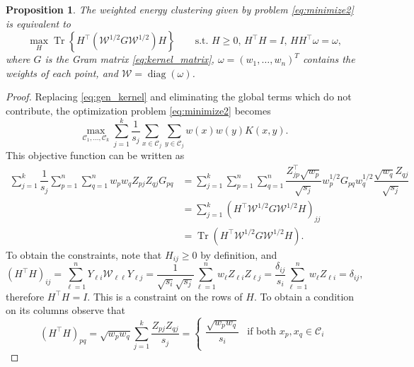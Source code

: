 \documentclass[aps,preprint,nofootinbib,floatfix]{revtex4-1}
\newtheorem{proposition}[theorem]{Proposition}
\DeclareMathOperator{\diag}{diag}
\DeclareMathOperator{\Tr}{Tr}
\newcommand\kk{K}
\newcommand\C{{\mathcal{C}}}
\newcommand\om{\omega}
\begin{document}
\begin{proposition}
\label{th:qcqp3}
The weighted energy clustering given by
problem \eqref{eq:minimize2} is equivalent to
\begin{equation}
\label{eq:qcqp3}
\max_H \Tr \left\{ H^\top (\mathcal{W}^{1/2} G \mathcal{W}^{1/2}) H  \right\}
\qquad \mbox{s.t. $H \ge 0$, $H^\top H = I$, $H H^\top \om =
\om$,}
\end{equation}
where $G$ is the Gram matrix \eqref{eq:kernel_matrix}, 
$\om = (w_1,\dotsc,w_n)^T$ contains the weights of each point, and
$\mathcal{W} = \diag(\omega)$.
\end{proposition}
\begin{proof}
Replacing \eqref{eq:gen_kernel} and eliminating the global terms which 
do not contribute, the optimization problem \eqref{eq:minimize2}
becomes 
\begin{equation}
\max_{\C_1,\dotsc,\C_k} \sum_{j=1}^k \dfrac{1}{s_j}
\sum_{x\in\C_j}\sum_{y\in\C_j} w(x)w(y) \kk(x,y) . 
\end{equation}
This 
objective function can be written as
\begin{equation}
\begin{split}
\sum_{j=1}^k \dfrac{1}{s_j} 
\sum_{p=1}^n \sum_{q=1}^n 
w_p w_q Z_{pj} Z_{qj} G_{pq} &= 
\sum_{j=1}^k 
\sum_{p=1}^n \sum_{q=1}^n 
\dfrac{Z^\top_{jp}\sqrt{w_p}}{\sqrt{s_j}} w_p^{1/2} G_{pq} w_q^{1/2} 
\dfrac{\sqrt{w_q} Z_{qj}}{\sqrt{s_j}} \\
&= 
\sum_{j=1}^k \left(H^\top \mathcal{W}^{1/2} G \mathcal{W}^{1/2} H\right)_{jj}
\\
&= \Tr\left( H^\top \mathcal{W}^{1/2} G \mathcal{W}^{1/2} H  \right).
\end{split}
\end{equation}
To obtain the constraints, note that $H_{ij} \ge 0$ by definition, and
\begin{equation}
(H^\top H)_{ij} = \sum_{\ell=1}^n 
Y_{\ell i} \mathcal{W}_{\ell \ell} Y_{\ell j } = 
\dfrac{1}{\sqrt{s_i}\sqrt{s_j}} \sum_{\ell=1}^n w_\ell Z_{\ell i} Z_{\ell j}
= \dfrac{\delta_{ij}}{s_i} \sum_{\ell=1}^n w_\ell Z_{\ell i} = \delta_{ij},
\end{equation}
therefore $H^\top H = I$. This is a constraint on the rows of $H$.
To obtain a condition on its columns
observe that
\begin{equation}
\left(H^\top H\right)_{pq} = \sqrt{w_p w_q}\sum_{j=1}^k \dfrac{Z_{pj}
Z_{qj}}{s_j} = \begin{cases}
\dfrac{\sqrt{w_p w_q}}{s_i} & \mbox{if both $x_p,x_q \in \C_i$} \\

\end{cases}
\end{equation}
\end{proof}
\end{document}
